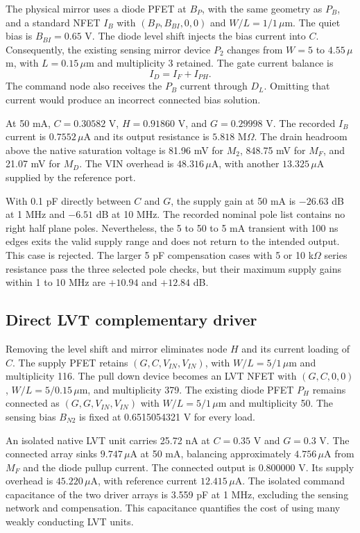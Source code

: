 The physical mirror uses a diode PFET at $B_P$, with the same geometry as $P_B$, and a standard NFET $I_B$ with $(B_P,B_{BI},0,0)$ and $W/L=1/1\,\mu$m. The quiet bias is $B_{BI}=0.65$ V. The diode level shift injects the bias current into $C$. Consequently, the existing sensing mirror device $P_2$ changes from $W=5$ to $4.55\,\mu$m, with $L=0.15\,\mu$m and multiplicity 3 retained. The gate current balance is
\begin{equation}
 I_D=I_F+I_{PH}.
\end{equation}
The command node also receives the $P_B$ current through $D_L$. Omitting that current would produce an incorrect connected bias solution.

At 50 mA, $C=0.30582$ V, $H=0.91860$ V, and $G=0.29998$ V. The recorded $I_B$ current is $0.7552\,\mu$A and its output resistance is $5.818$ M$\Omega$. The drain headroom above the native saturation voltage is 81.96 mV for $M_2$, 848.75 mV for $M_F$, and 21.07 mV for $M_D$. The VIN overhead is $48.316\,\mu$A, with another $13.325\,\mu$A supplied by the reference port.

With 0.1 pF directly between $C$ and $G$, the supply gain at 50 mA is $-26.63$ dB at 1 MHz and $-6.51$ dB at 10 MHz. The recorded nominal pole list contains no right half plane poles. Nevertheless, the 5 to 50 to 5 mA transient with 100 ns edges exits the valid supply range and does not return to the intended output. This case is rejected. The larger 5 pF compensation cases with 5 or 10 k$\Omega$ series resistance pass the three selected pole checks, but their maximum supply gains within 1 to 10 MHz are $+10.94$ and $+12.84$ dB.

\subsection{Direct LVT complementary driver}
Removing the level shift and mirror eliminates node $H$ and its current loading of $C$. The supply PFET retains $(G,C,V_{IN},V_{IN})$, with $W/L=5/1\,\mu$m and multiplicity 116. The pull down device becomes an LVT NFET with $(G,C,0,0)$, $W/L=5/0.15\,\mu$m, and multiplicity 379. The existing diode PFET $P_H$ remains connected as $(G,G,V_{IN},V_{IN})$ with $W/L=5/1\,\mu$m and multiplicity 50. The sensing bias $B_{N2}$ is fixed at 0.6515054321 V for every load.

An isolated native LVT unit carries 25.72 nA at $C=0.35$ V and $G=0.3$ V. The connected array sinks $9.747\,\mu$A at 50 mA, balancing approximately $4.756\,\mu$A from $M_F$ and the diode pullup current. The connected output is 0.800000 V. Its supply overhead is $45.220\,\mu$A, with reference current $12.415\,\mu$A. The isolated command capacitance of the two driver arrays is 3.559 pF at 1 MHz, excluding the sensing network and compensation. This capacitance quantifies the cost of using many weakly conducting LVT units.

